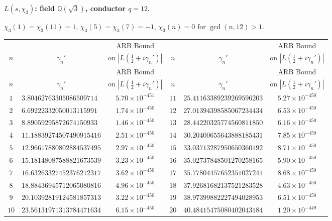 \documentclass[12pt,reqno]{amsart}
\theoremstyle{plain}
\theoremstyle{definition}
\theoremstyle{remark}
\newcommand{\Q}{\mathbb{Q}}
\begin{document}
\medskip\noindent\textbf{$L(s,\chi_3)$: field $\Q(\sqrt{3})$, conductor $q=12$.}\par\smallskip
\label{app:chi12-zeros}

$\chi_3(1)=\chi_3(11)=1$, $\chi_3(5)=\chi_3(7)=-1$, $\chi_3(n)=0$ for $\gcd(n,12)>1$.

\renewcommand{\arraystretch}{1.05}\footnotesize
\begin{longtable}{clc|clc}
\toprule
 & & \multicolumn{1}{c}{ARB Bound} &
 & & \multicolumn{1}{c}{ARB Bound} \\
$n$ & \multicolumn{1}{c}{$\gamma_n'$} & \multicolumn{1}{c}{on $|L(\tfrac{1}{2}+i\gamma_n')|$} &
$n$ & \multicolumn{1}{c}{$\gamma_n'$} & \multicolumn{1}{c}{on $|L(\tfrac{1}{2}+i\gamma_n')|$} \\
\midrule
\endfirsthead
\toprule
 & & \multicolumn{1}{c}{ARB Bound} &
 & & \multicolumn{1}{c}{ARB Bound} \\
$n$ & \multicolumn{1}{c}{$\gamma_n'$} & \multicolumn{1}{c}{on $|L(\tfrac{1}{2}+i\gamma_n')|$} &
$n$ & \multicolumn{1}{c}{$\gamma_n'$} & \multicolumn{1}{c}{on $|L(\tfrac{1}{2}+i\gamma_n')|$} \\
\midrule
\endhead
\bottomrule
\endlastfoot
$1$ & $3.80462763305086509714$ & $5.70 \times 10^{-451}$ & $11$ & $25.41163389239269596203$ & $5.27 \times 10^{-450}$ \\
$2$ & $6.69222332050013115991$ & $1.74 \times 10^{-450}$ & $12$ & $27.01394398585067234434$ & $6.53 \times 10^{-450}$ \\
$3$ & $8.89059295872674150933$ & $1.46 \times 10^{-450}$ & $13$ & $28.44220325774560811850$ & $6.16 \times 10^{-450}$ \\
$4$ & $11.18839274507490915416$ & $2.51 \times 10^{-450}$ & $14$ & $30.20400655643888185431$ & $7.85 \times 10^{-450}$ \\
$5$ & $12.96617880802884537495$ & $2.97 \times 10^{-450}$ & $15$ & $33.03713287950650360192$ & $8.71 \times 10^{-450}$ \\
$6$ & $15.18148087588821673539$ & $3.23 \times 10^{-450}$ & $16$ & $35.02737848501270258165$ & $5.90 \times 10^{-450}$ \\
$7$ & $16.63263327452376212317$ & $3.62 \times 10^{-450}$ & $17$ & $35.77804457652351027241$ & $8.68 \times 10^{-450}$ \\
$8$ & $18.88436945712065080816$ & $4.96 \times 10^{-450}$ & $18$ & $37.92681682137521283528$ & $4.63 \times 10^{-450}$ \\
$9$ & $20.10392819124581857313$ & $3.22 \times 10^{-450}$ & $19$ & $38.97399882227494028953$ & $6.51 \times 10^{-450}$ \\
$10$ & $23.56131971313784471634$ & $6.15 \times 10^{-450}$ & $20$ & $40.48415475080402043184$ & $1.20 \times 10^{-449}$ \\

\end{longtable}
\normalsize
\end{document}
